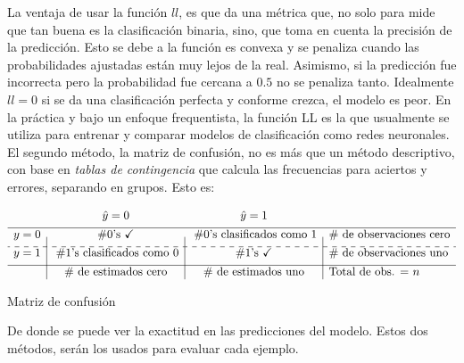 \documentclass[../Main/Main.tex]{subfiles}
\begin{document}
La ventaja de usar la función $ll$, es que da una métrica que, no solo para mide que tan buena es la clasificación binaria, sino, que toma en cuenta la precisión de la predicción. Esto se debe a la función es convexa y se penaliza cuando las probabilidades ajustadas están muy lejos de la real. Asimismo, si la predicción fue incorrecta pero la probabilidad fue cercana a $0.5$ no se penaliza tanto. Idealmente $ll = 0$ si se da una clasificación perfecta y conforme crezca, el modelo es peor. En la práctica y bajo un enfoque frequentista, la función LL es la que usualmente se utiliza para entrenar y comparar modelos de clasificación como redes neuronales.\\

El segundo método, la matriz de confusión, no es más que un método descriptivo, con base en \textit{tablas de contingencia} que calcula las frecuencias para aciertos y errores, separando en grupos. Esto es:
\begin{table}[h]
\centering
$\begin{array}{c|c|c|l}
~ & \hat{y} = 0 & \hat{y} = 1 & ~ \\[4pt]
\hline
y = 0 & \# 0\text{'s } \checkmark  & \;\# 0\text{'s clasificados como }1 & \#\text{ de observaciones cero} \\[4pt]
\cdashline{1-4}
y = 1 & \;\# 1\text{'s clasificados como }0 & \# 1\text{'s } \checkmark & \#\text{ de observaciones uno} \\[4pt]
\hline
~ & \# \text{ de estimados cero} & \# \text{ de estimados uno} &  \text{Total de obs. = } n
\end{array}$
\caption{Matriz de confusión}
\label{tab:MatrizConfusion}
\end{table}

De donde se puede ver la exactitud en las predicciones del modelo. Estos dos métodos, serán los usados para evaluar cada ejemplo. 
\end{document}
